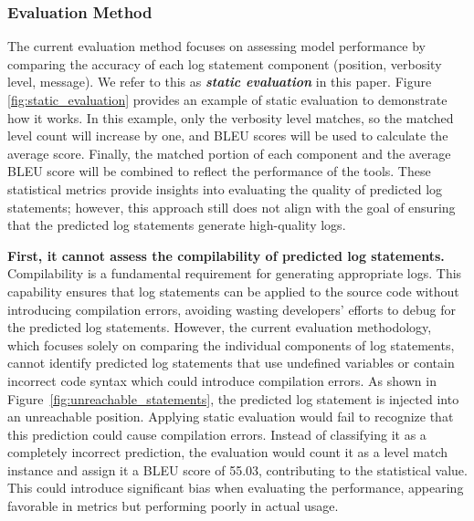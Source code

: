 

\subsubsection{Evaluation Method}
\label{sec: Motivation: Evaluation Method}
The current evaluation method focuses on assessing model performance by comparing the accuracy of each log statement component (\ie position, verbosity level, message). We refer to this as \textit{\textbf{static evaluation}} in this paper. Figure \ref{fig:static_evaluation} provides an example of static evaluation to demonstrate how it works. In this example, only the verbosity level matches, so the matched level count will increase by one, and BLEU scores will be used to calculate the average score. Finally, the matched portion of each component and the average BLEU score will be combined to reflect the performance of the tools. These statistical metrics provide insights into evaluating the quality of predicted log statements; however, this approach still does not align with the goal of ensuring that the predicted log statements generate high-quality logs.

% 

\textbf{First, it cannot assess the compilability of predicted log statements.} Compilability is a fundamental requirement for generating appropriate logs. This capability ensures that log statements can be applied to the source code without introducing compilation errors, avoiding wasting developers' efforts to debug for the predicted log statements. 
However, the current evaluation methodology, which focuses solely on comparing the individual components of log statements, cannot identify predicted log statements that use undefined variables or contain incorrect code syntax which could introduce compilation errors. As shown in Figure~\ref{fig:unreachable_statements}, the predicted log statement is injected into an unreachable position. Applying static evaluation would fail to recognize that this prediction could cause compilation errors. Instead of classifying it as a completely incorrect prediction, the evaluation would count it as a level match instance and assign it a BLEU score of 55.03, contributing to the statistical value. This could introduce significant bias when evaluating the performance, appearing favorable in metrics but performing poorly in actual usage.

